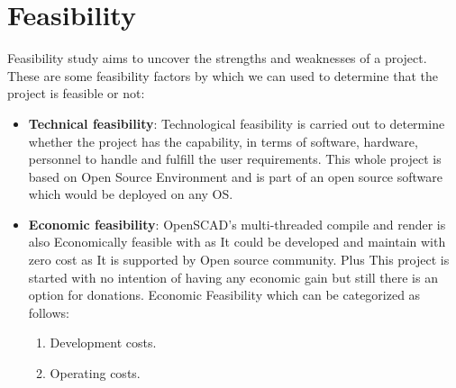 \section{Feasibility}
Feasibility study aims to uncover the strengths and weaknesses of
a project. These are some feasibility factors by which we can used to determine that the project is feasible or not:
\begin{itemize}
	\item {\bf{Technical feasibility}}: Technological feasibility is carried out to determine whether the project has the capability, in terms of software, hardware, personnel to handle and fulfill the user requirements. This whole project is based on Open Source Environment and is part of an open source software which would be deployed on any OS.
	\item {\bf{Economic feasibility}}: OpenSCAD's multi-threaded compile and render is also Economically feasible with as It could be developed and maintain with zero cost as It is supported by Open source community. Plus This project is started with no intention of having any economic gain but still there is an option for donations. Economic Feasibility which can be categorized as follows:
		\begin{enumerate}
			\item Development costs.
			\item Operating costs.
		\end{enumerate}														
\end{itemize}
